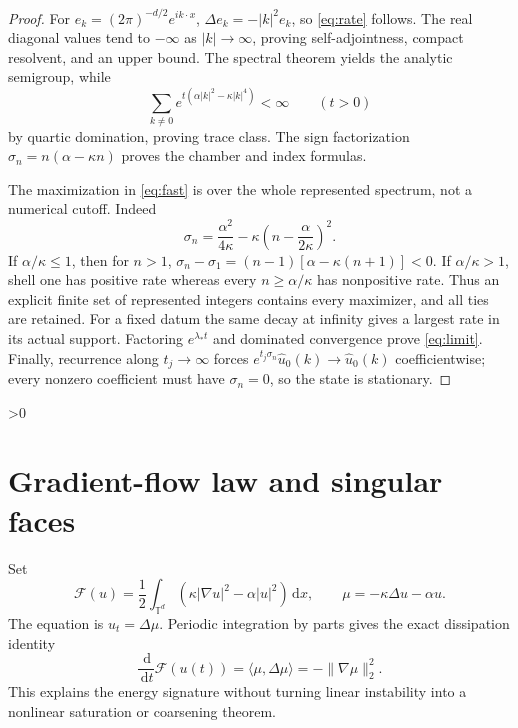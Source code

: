 \documentclass[10pt]{article}
\providecommand{\CRevisionRound}{2}
\newcommand{\T}{\mathbb T}
\newcommand{\dd}{\,\mathrm d}
\begin{document}
\begin{proof}
For $e_k=(2\pi)^{-d/2}e^{ik\cdot x}$, $\Delta e_k=-|k|^2e_k$, so
\eqref{eq:rate} follows. The real diagonal values tend to $-\infty$ as
$|k|\to\infty$, proving self-adjointness, compact resolvent, and an upper
bound. The spectral theorem yields the analytic semigroup, while
\[
 \sum_{k\ne0}e^{t(\alpha|k|^2-\kappa|k|^4)}<\infty\qquad(t>0)
\]
by quartic domination, proving trace class. The sign factorization
$\sigma_n=n(\alpha-\kappa n)$ proves the chamber and index formulas.

The maximization in \eqref{eq:fast} is over the whole represented spectrum,
not a numerical cutoff. Indeed
\begin{equation}\label{eq:square}
 \sigma_n=\frac{\alpha^2}{4\kappa}
 -\kappa\left(n-\frac{\alpha}{2\kappa}\right)^2.
\end{equation}
If $\alpha/\kappa\le1$, then for $n>1$,
$\sigma_n-\sigma_1=(n-1)[\alpha-\kappa(n+1)]<0$. If
$\alpha/\kappa>1$, shell one has positive rate whereas every
$n\ge\alpha/\kappa$ has nonpositive rate. Thus an explicit finite set of
represented integers contains every maximizer, and all ties are retained.
For a fixed datum the same decay at infinity gives a largest rate in its
actual support. Factoring $e^{\lambda_*t}$ and dominated convergence prove
\eqref{eq:limit}. Finally, recurrence along $t_j\to\infty$ forces
$e^{t_j\sigma_n}\widehat u_0(k)\to\widehat u_0(k)$ coefficientwise; every
nonzero coefficient must have $\sigma_n=0$, so the state is stationary.
\end{proof}

\ifnum\CRevisionRound>0
\section{Gradient-flow law and singular faces}
Set
\[
 \mathcal F(u)=\frac12\int_{\T^d}
 (\kappa|\nabla u|^2-\alpha|u|^2)\dd x,
 \qquad \mu=-\kappa\Delta u-\alpha u.
\]
The equation is $u_t=\Delta\mu$. Periodic integration by parts gives the
exact dissipation identity
\begin{equation}\label{eq:energy}
 \frac{\dd}{\dd t}\mathcal F(u(t))
 =\langle\mu,\Delta\mu\rangle=-\|\nabla\mu\|_2^2.
\end{equation}
This explains the energy signature without turning linear instability into
a nonlinear saturation or coarsening theorem.
\end{document}
